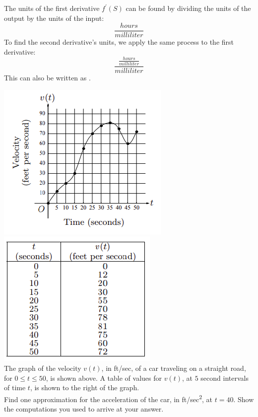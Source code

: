 \documentclass[12pt,letterpaper, onecolumn]{exam}
\begin{document}
\begin{questions}

	\begin{solution}
		The units of the first derivative $f^{\prime}(S)$ can be found by dividing the units of the output by the units of the input: 
		$$\frac{hours}{milliliter}$$
		To find the second derivative's units, we apply the same process to the first derivative:
		$$\frac{\frac{hours}{milliliter}}{milliliter}$$
		This can also be written as .
	\end{solution}

\question
	\includegraphics[width=0.5\linewidth]{Question8-001}
	\includegraphics[width=0.5\linewidth]{Question8-002} \\
	The graph of the velocity $v(t)$, in ft/sec, of a car traveling on a straight road, for $0 \leq t \leq 50$, is shown above. A table of values for $v(t)$, at $5$ second intervals of time $t$, is shown to the right of the graph. \\
	Find one approximation for the acceleration of the car, in ft/sec\textsuperscript{2}, at $t = 40$. Show the computations you used to arrive at your answer.
	

\end{questions}
\end{document}

